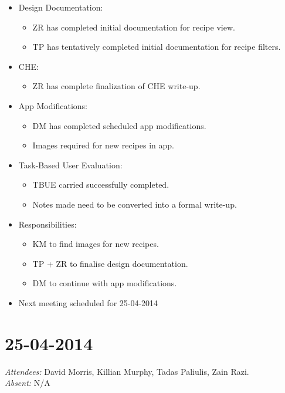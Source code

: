 \documentclass{article}
\begin{document}
\begin{itemize}
\item Design Documentation:
  \begin{itemize}
  \item ZR has completed initial documentation for recipe view.
  \item TP has tentatively completed initial documentation for recipe filters.
  \end{itemize}
\item CHE:
  \begin{itemize}
  \item ZR has complete finalization of CHE write-up.
  \end{itemize}
\item App Modifications:
  \begin{itemize}
  \item DM has completed scheduled app modifications.
  \item Images required for new recipes in app.
  \end{itemize}
  \item Task-Based User Evaluation:
  \begin{itemize}
  \item TBUE carried successfully completed.
  \item Notes made need to be converted into a formal write-up.
  \end{itemize}
\item Responsibilities:
  \begin{itemize}
  \item KM to find images for new recipes.
  \item TP + ZR to finalise design documentation.
  \item DM to continue with app modifications.
  \end{itemize}
\item Next meeting scheduled for 25-04-2014
\end{itemize}

\clearpage

\section*{25-04-2014}
\vspace{0.5cm}
\emph{Attendees: }David Morris, Killian Murphy, Tadas Paliulis, Zain Razi.
\\
\emph{Absent: }N/A
\end{document}
